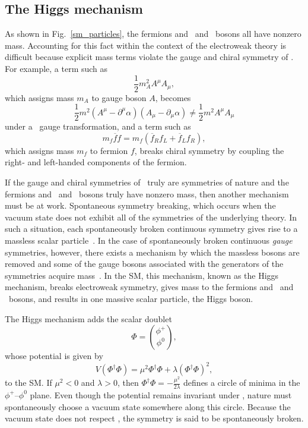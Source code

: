 \subsection{The Higgs mechanism}
As shown in Fig.~\ref{sm_particles}, the fermions and \PWpm\ and \cPZ\ bosons all have nonzero mass. Accounting for this fact within the context of the electroweak theory is difficult because explicit mass terms violate the gauge and chiral symmetry of \ewsymm. For example, a term such as
\begin{equation}
    \frac{1}{2}m_{A}^{2}A^{\mu}A_{\mu},
\end{equation}
which assigns mass $m_{A}$ to gauge boson $A$, becomes
\begin{equation}
    \frac{1}{2}m^{2}(A^{\mu}-\partial^{\mu}\alpha)(A_{\mu}-\partial_{\mu}\alpha) \neq \frac{1}{2}m^{2}A^{\mu}A_{\mu}
\end{equation}
under a \uoney\ gauge transformation, and a term such as
\begin{equation}
    m_{f}\overline{f}f = m_{f}(\overline{f}_{R}f_{L} + \overline{f}_{L}f_{R}),
\end{equation}
which assigns mass $m_{f}$ to fermion $f$, breaks chiral symmetry by coupling the right- and left-handed components of the fermion.

If the gauge and chiral symmetries of \smsymm\ truly are symmetries of nature and the fermions and \PWpm\ and \cPZ\ bosons truly have nonzero mass, then another mechanism must be at work. Spontaneous symmetry breaking, which occurs when the vacuum state does not exhibit all of the symmetries of the underlying theory. In such a situation, each spontaneously broken continuous symmetry gives rise to a massless scalar particle~\cite{goldstone_salam_weinberg}. In the case of spontaneously broken continuous \textit{gauge} symmetries, however, there exists a mechanism by which the massless bosons are removed and some of the gauge bosons associated with the generators of the symmetries acquire mass~\cite{englert, higgs, kibble}. In the SM, this mechanism, known as the Higgs mechanism, breaks electroweak symmetry, gives mass to the fermions and \PWpm\ and \cPZ\ bosons, and results in one massive scalar particle, the Higgs boson.

The Higgs mechanism adds the scalar doublet
\begin{equation}
    \Phi = \binom{\phi^{+}}{\phi^{0}},
\end{equation}
whose potential is given by
\begin{equation}
    V(\Phi^{\dagger}\Phi) = \mu^{2}\Phi^{\dagger}\Phi + \lambda(\Phi^{\dagger}\Phi)^{2},
\end{equation}
to the SM. If $\mu^{2}<0$ and $\lambda>0$, then $\Phi^{\dagger}\Phi = -\frac{\mu^{2}}{2\lambda}$ defines a circle of minima in the $\phi^{+}$--$\phi^{0}$ plane. Even though the potential remains invariant under \ewsymm, nature must spontaneously choose a vacuum state somewhere along this circle. Because the vacuum state does not respect \ewsymm, the symmetry is said to be spontaneously broken.

